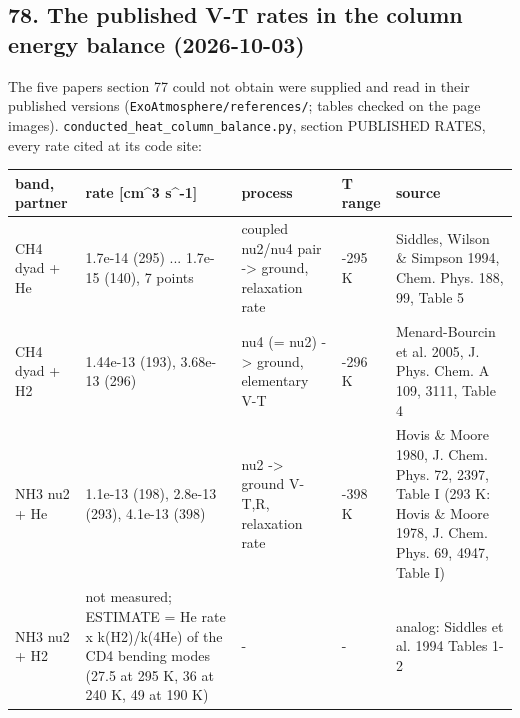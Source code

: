 \documentclass[english,a4paper]{my_memo}
\begin{document}
\subsection{78. The published V-T rates in the column energy balance (2026-10-03)}\label{78-the-published-v-t-rates-in-the-column-energy-balance-2026-10-03}

The five papers section 77 could not obtain were supplied and read in
their published versions (\texttt{ExoAtmosphere/references/}; tables checked on
the page images). \texttt{conducted\_heat\_column\_balance.py}, section PUBLISHED
RATES, every rate cited at its code site:

{\def\LTcaptype{none} %
{\small
\begin{longtable}[]{@{}>{\raggedright\arraybackslash}p{\dimexpr(\linewidth-10\tabcolsep)/5\relax}>{\raggedright\arraybackslash}p{\dimexpr(\linewidth-10\tabcolsep)/5\relax}>{\raggedright\arraybackslash}p{\dimexpr(\linewidth-10\tabcolsep)/5\relax}>{\raggedright\arraybackslash}p{\dimexpr(\linewidth-10\tabcolsep)/5\relax}>{\raggedright\arraybackslash}p{\dimexpr(\linewidth-10\tabcolsep)/5\relax}@{}}
\toprule\noalign{}
band, partner & rate {[}cm\^{}3 s\^{}-1{]} & process & T range & source \\
\midrule\noalign{}
\endhead
\bottomrule\noalign{}
\endlastfoot
CH4 dyad + He & 1.7e-14 (295) ... 1.7e-15 (140), 7 points & coupled nu2/nu4 pair -\textgreater{} ground, relaxation rate & 140-295 K & Siddles, Wilson \& Simpson 1994, Chem. Phys. 188, 99, Table 5 \\
CH4 dyad + H2 & 1.44e-13 (193), 3.68e-13 (296) & nu4 (= nu2) -\textgreater{} ground, elementary V-T & 193-296 K & Menard-Bourcin et al. 2005, J. Phys. Chem. A 109, 3111, Table 4 \\
NH3 nu2 + He & 1.1e-13 (198), 2.8e-13 (293), 4.1e-13 (398) & nu2 -\textgreater{} ground V-T,R, relaxation rate & 198-398 K & Hovis \& Moore 1980, J. Chem. Phys. 72, 2397, Table I (293 K: Hovis \& Moore 1978, J. Chem. Phys. 69, 4947, Table I) \\
NH3 nu2 + H2 & not measured; ESTIMATE = He rate x k(H2)/k(4He) of the CD4 bending modes (27.5 at 295 K, 36 at 240 K, 49 at 190 K) & - & - & analog: Siddles et al. 1994 Tables 1-2 \\
\end{longtable}
}
}
\end{document}
